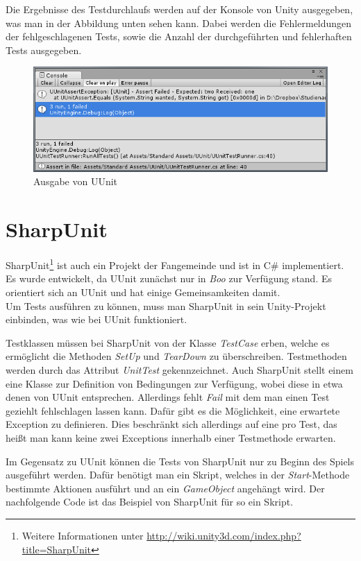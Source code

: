 Die Ergebnisse des Testdurchlaufs werden auf der Konsole von Unity ausgegeben, was man in der Abbildung unten sehen kann. Dabei werden die Fehlermeldungen der fehlgeschlagenen Tests, sowie die Anzahl der durchgeführten und fehlerhaften Tests ausgegeben.

\begin{figure}[h]
\centering
\includegraphics[width=1\linewidth]{./images/Kapitel_UnitTestsMitUnity/UUnit_Konsolenausgabe}
\caption[Ausgabe von UUnit]{Ausgabe von UUnit}
\label{fig:UUnit_Konsolenausgabe}
\end{figure}
\clearpage

\section{SharpUnit}\label{sec:SharpUnit}

SharpUnit\footnote{Weitere Informationen unter \url{http://wiki.unity3d.com/index.php?title=SharpUnit}} ist auch ein Projekt der Fangemeinde und ist in C\# implementiert. Es wurde entwickelt, da UUnit zunächst nur in \textit{Boo} zur Verfügung stand. Es orientiert sich an UUnit und hat einige Gemeinsamkeiten damit.\\
Um Tests ausführen zu können, muss man SharpUnit in sein Unity-Projekt einbinden, was wie bei UUnit funktioniert.

Testklassen müssen bei SharpUnit von der Klasse \textit{TestCase} erben, welche es ermöglicht die Methoden \textit{SetUp} und \textit{TearDown} zu überschreiben. Testmethoden werden durch das Attribut \textit{UnitTest} gekennzeichnet. Auch SharpUnit stellt einem eine Klasse zur Definition von Bedingungen zur Verfügung, wobei diese in etwa denen von UUnit entsprechen. Allerdings fehlt \textit{Fail} mit dem man einen Test geziehlt fehlschlagen lassen kann. Dafür gibt es die Möglichkeit, eine erwartete Exception zu definieren. Dies beschränkt sich allerdings auf eine pro Test, das heißt man kann keine zwei Exceptions innerhalb einer Testmethode erwarten.
 
Im Gegensatz zu UUnit können die Tests von SharpUnit nur zu Beginn des Spiels ausgeführt werden. Dafür benötigt man ein Skript, welches in der \textit{Start}-Methode bestimmte Aktionen ausführt und an ein \textit{GameObject} angehängt wird. Der nachfolgende Code ist das Beispiel von SharpUnit für so ein Skript.
\pagebreak

